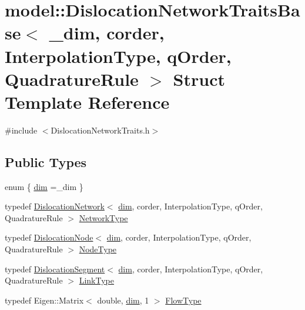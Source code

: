 \hypertarget{structmodel_1_1_dislocation_network_traits_base}{}\section{model\+:\+:Dislocation\+Network\+Traits\+Base$<$ \+\_\+dim, corder, Interpolation\+Type, q\+Order, Quadrature\+Rule $>$ Struct Template Reference}
\label{structmodel_1_1_dislocation_network_traits_base}


{\ttfamily \#include $<$Dislocation\+Network\+Traits.\+h$>$}

\subsection*{Public Types}
\begin{DoxyCompactItemize}
\item 
enum \{ \hyperlink{structmodel_1_1_dislocation_network_traits_base_a4fc6af2f3f7c090b878e886427b3cdeea70440340d2141c79ba221e3464826940}{dim} =\+\_\+dim
 \}
\item 
typedef \hyperlink{classmodel_1_1_dislocation_network}{Dislocation\+Network}$<$ \hyperlink{structmodel_1_1_dislocation_network_traits_base_a4fc6af2f3f7c090b878e886427b3cdeea70440340d2141c79ba221e3464826940}{dim}, corder, Interpolation\+Type, q\+Order, Quadrature\+Rule $>$ \hyperlink{structmodel_1_1_dislocation_network_traits_base_ad1c4fef95e4639548d6371751f1ada53}{Network\+Type}
\item 
typedef \hyperlink{classmodel_1_1_dislocation_node}{Dislocation\+Node}$<$ \hyperlink{structmodel_1_1_dislocation_network_traits_base_a4fc6af2f3f7c090b878e886427b3cdeea70440340d2141c79ba221e3464826940}{dim}, corder, Interpolation\+Type, q\+Order, Quadrature\+Rule $>$ \hyperlink{structmodel_1_1_dislocation_network_traits_base_a7e0bbc0b2e0f806678b7a1970cb85ec4}{Node\+Type}
\item 
typedef \hyperlink{classmodel_1_1_dislocation_segment}{Dislocation\+Segment}$<$ \hyperlink{structmodel_1_1_dislocation_network_traits_base_a4fc6af2f3f7c090b878e886427b3cdeea70440340d2141c79ba221e3464826940}{dim}, corder, Interpolation\+Type, q\+Order, Quadrature\+Rule $>$ \hyperlink{structmodel_1_1_dislocation_network_traits_base_abf174d97083b39a2071a69f1dc5d079c}{Link\+Type}
\item 
typedef Eigen\+::\+Matrix$<$ double, \hyperlink{structmodel_1_1_dislocation_network_traits_base_a4fc6af2f3f7c090b878e886427b3cdeea70440340d2141c79ba221e3464826940}{dim}, 1 $>$ \hyperlink{structmodel_1_1_dislocation_network_traits_base_ac676e7afc348be370687f06de004e062}{Flow\+Type}
\end{DoxyCompactItemize}


